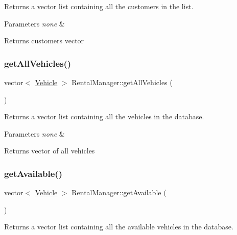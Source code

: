 Returns a vector list containing all the customers in the list.


\begin{DoxyParams}{Parameters}
{\em none} & \\
\hline
\end{DoxyParams}
\begin{DoxyReturn}{Returns}
customers vector 
\end{DoxyReturn}
\mbox{\label{class_rental_manager_a4b719aa2506aafc07656fc1c45c94aca}} 
\subsubsection{\texorpdfstring{get\+All\+Vehicles()}{getAllVehicles()}}
{\footnotesize\ttfamily vector$<$ \hyperlink{class_vehicle}{Vehicle} $>$ Rental\+Manager\+::get\+All\+Vehicles (\begin{DoxyParamCaption}{ }\end{DoxyParamCaption})}

Returns a vector list containing all the vehicles in the database.


\begin{DoxyParams}{Parameters}
{\em none} & \\
\hline
\end{DoxyParams}
\begin{DoxyReturn}{Returns}
vector of all vehicles 
\end{DoxyReturn}
\mbox{\label{class_rental_manager_adf8270be0e9980c4cee3deb484392e15}} 
\subsubsection{\texorpdfstring{get\+Available()}{getAvailable()}}
{\footnotesize\ttfamily vector$<$ \hyperlink{class_vehicle}{Vehicle} $>$ Rental\+Manager\+::get\+Available (\begin{DoxyParamCaption}{ }\end{DoxyParamCaption})}

Returns a vector list containing all the available vehicles in the database.


